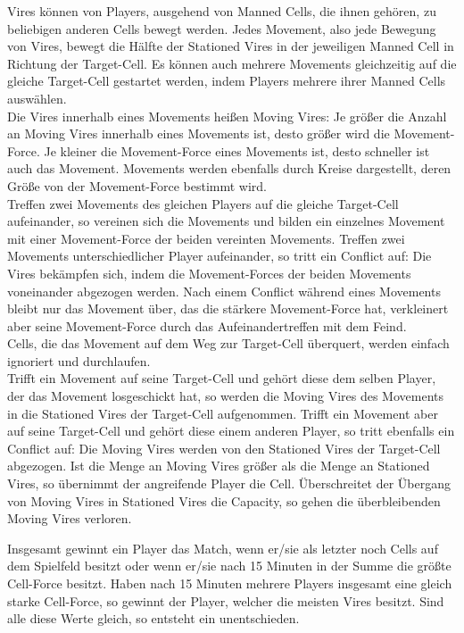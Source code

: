 Vires können von Players, ausgehend von Manned Cells, die ihnen gehören, zu beliebigen anderen Cells bewegt werden. 
Jedes Movement, also jede Bewegung von Vires, bewegt die Hälfte der Stationed Vires in der jeweiligen Manned Cell in Richtung der Target-Cell.
Es können auch mehrere Movements gleichzeitig auf die gleiche Target-Cell gestartet werden, indem Players mehrere ihrer Manned Cells auswählen. \\
Die Vires innerhalb eines Movements heißen Moving Vires: Je größer die Anzahl an Moving Vires innerhalb eines Movements ist, desto größer wird die Movement-Force.
Je kleiner die Movement-Force eines Movements ist, desto schneller ist auch das Movement.
Movements werden ebenfalls durch Kreise dargestellt, deren Größe von der Movement-Force bestimmt wird. \\
Treffen zwei Movements des gleichen Players auf die gleiche Target-Cell aufeinander, so vereinen sich die Movements und bilden ein einzelnes Movement mit einer Movement-Force der beiden vereinten Movements.
Treffen zwei Movements unterschiedlicher Player aufeinander, so tritt ein Conflict auf: Die Vires bekämpfen sich, indem die Movement-Forces der beiden Movements voneinander abgezogen werden. Nach einem Conflict während eines Movements bleibt nur das Movement über, das die stärkere Movement-Force hat, verkleinert aber seine Movement-Force durch das Aufeinandertreffen mit dem Feind. \\
Cells, die das Movement auf dem Weg zur Target-Cell überquert, werden einfach ignoriert und durchlaufen. \\
Trifft ein Movement auf seine Target-Cell und gehört diese dem selben Player, der das Movement losgeschickt hat, so werden die Moving Vires des Movements in die Stationed Vires der Target-Cell aufgenommen.
Trifft ein Movement aber auf seine Target-Cell und gehört diese einem anderen Player, so tritt ebenfalls ein Conflict auf: Die Moving Vires werden von den Stationed Vires der Target-Cell abgezogen. Ist die Menge an Moving Vires größer als die Menge an Stationed Vires, so übernimmt der angreifende Player die Cell.
Überschreitet der Übergang von Moving Vires in Stationed Vires die Capacity, so gehen die überbleibenden Moving Vires verloren.

Insgesamt gewinnt ein Player das Match, wenn er/sie als letzter noch Cells auf dem Spielfeld besitzt oder wenn er/sie nach 15 Minuten in der Summe die größte Cell-Force besitzt. Haben nach 15 Minuten mehrere Players insgesamt eine gleich starke Cell-Force, so gewinnt der Player, welcher die meisten Vires besitzt. Sind alle diese Werte gleich, so entsteht ein unentschieden.

